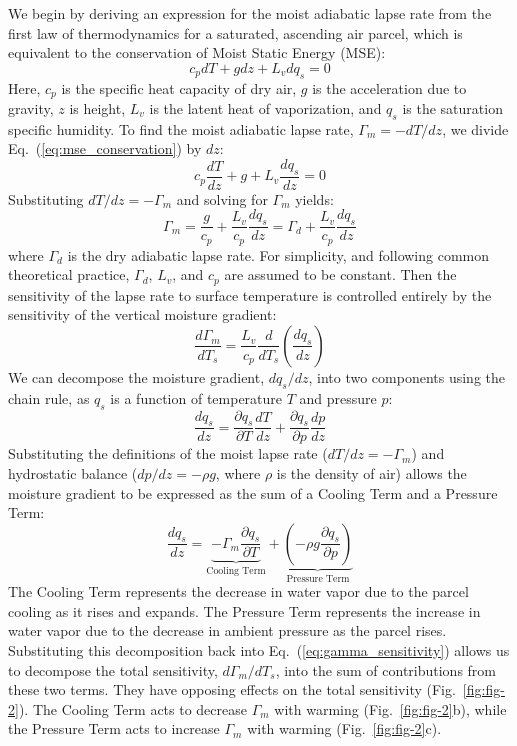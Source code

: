 \documentclass{ametsocV6.1}
\begin{document}
We begin by deriving an expression for the moist adiabatic lapse rate from the first law of thermodynamics for a saturated, ascending air parcel, which is equivalent to the conservation of Moist Static Energy (MSE):
\begin{equation}
c_p dT+gdz+L_v dq_s=0 \label{eq:mse_conservation}
\end{equation}
Here, $c_p$ is the specific heat capacity of dry air, $g$ is the acceleration due to gravity, $z$ is height, $L_v$ is the latent heat of vaporization, and $q_s$ is the saturation specific humidity. To find the moist adiabatic lapse rate, $\Gamma_m=-dT/dz$, we divide Eq.~(\ref{eq:mse_conservation}) by $dz$:
\begin{equation}
c_p \frac{dT}{dz}+g+L_v\frac{dq_s}{dz}=0 \label{eq:mse_dz}
\end{equation}
Substituting $dT/dz=-\Gamma_m$ and solving for $\Gamma_m$ yields:
\begin{equation}
\Gamma_m=\frac{g}{c_p}+\frac{L_v}{c_p}\frac{dq_s}{dz}=\Gamma_d+\frac{L_v}{c_p}\frac{dq_s}{dz} \label{eq:gamma_m}
\end{equation}
where $\Gamma_d$ is the dry adiabatic lapse rate. For simplicity, and following common theoretical practice, $\Gamma_d$, $L_v$, and $c_p$ are assumed to be constant. Then the sensitivity of the lapse rate to surface temperature is controlled entirely by the sensitivity of the vertical moisture gradient:
\begin{equation}
\frac{d\Gamma_m}{dT_s}=\frac{L_v}{c_p}\frac{d}{dT_s}\left(\frac{dq_s}{dz}\right) \label{eq:gamma_sensitivity}
\end{equation}
We can decompose the moisture gradient, $dq_s/dz$, into two components using the chain rule, as $q_s$ is a function of temperature $T$ and pressure $p$:
\begin{equation}
\frac{dq_s}{dz}=\frac{\partial q_s}{\partial T}\frac{dT}{dz}+\frac{\partial q_s}{\partial p}\frac{dp}{dz} \label{eq:dqs_dz_chain}
\end{equation}
Substituting the definitions of the moist lapse rate ($dT/dz=-\Gamma_m$) and hydrostatic balance ($dp/dz=-\rho g$, where $\rho$ is the density of air) allows the moisture gradient to be expressed as the sum of a Cooling Term and a Pressure Term:
\begin{equation}
\frac{dq_s}{dz} = \underbrace{-\Gamma_m\frac{\partial q_s}{\partial T}}_{\text{Cooling Term}} + \underbrace{\left(-\rho g\frac{\partial q_s}{\partial p}\right)}_{\text{Pressure Term}} \label{eq:dqs_dz_terms}
\end{equation}
The Cooling Term represents the decrease in water vapor due to the parcel cooling as it rises and expands. The Pressure Term represents the increase in water vapor due to the decrease in ambient pressure as the parcel rises. Substituting this decomposition back into Eq.~(\ref{eq:gamma_sensitivity}) allows us to decompose the total sensitivity, $d\Gamma_m/dT_s$, into the sum of contributions from these two terms. They have opposing effects on the total sensitivity (Fig.~\ref{fig:fig-2}). The Cooling Term acts to decrease $\Gamma_m$ with warming (Fig.~\ref{fig:fig-2}b), while the Pressure Term acts to increase $\Gamma_m$ with warming (Fig.~\ref{fig:fig-2}c).
\end{document}
